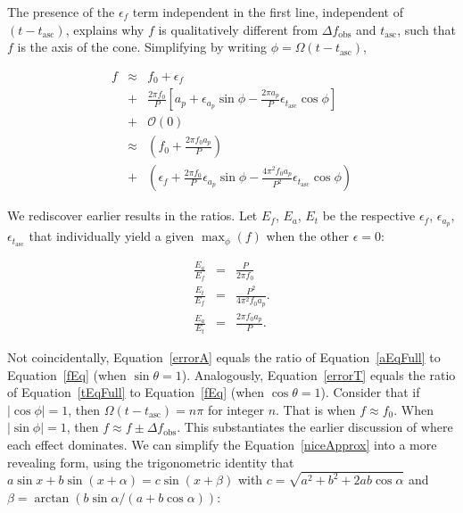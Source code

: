 \documentclass{article}
\begin{document}
The presence of the $\epsilon_f$ term independent in the first line, independent of $(t-t_\mathrm{asc})$, explains why $f$ is qualitatively different from $\Delta f_\mathrm{obs}$ and $t_\mathrm{asc}$, such that $f$ is the axis of the cone.
Simplifying by writing $\phi = \Omega (t- t_\mathrm{asc})$,

\begin{eqnarray}
f &\approx& f_0 + \epsilon_f \nonumber \\
                   &+&\frac{2 \pi f_0}{P}\left[
                     a_p
                   + \epsilon_{a_p} \sin \phi
                   - \frac{2 \pi  a_p}{P} \epsilon_{t_\mathrm{asc}} \cos \phi \right] \nonumber \\
                   &+& \mathcal{O}(0)\\
  &\approx& \left(f_0 + \frac{2\pi f_0 a_p}{P} \right) \nonumber \\
  &+& \left(\epsilon_f + \frac{2 \pi f_0}{P} \epsilon_{a_p} \sin\phi - \frac{4 \pi^2 f_0 a_p}{P^2} \epsilon_{t_\mathrm{asc}} \cos\phi\right)
\label{niceApprox}
\end{eqnarray}

We rediscover earlier results in the ratios.
Let $E_f$, $E_a$, $E_t$ be the respective $\epsilon_f$, $\epsilon_{a_p}$, $\epsilon_{t_\mathrm{asc}}$ that individually yield a given $\max_\phi (f)$ when the other $\epsilon =0$:

\begin{eqnarray}
\frac{E_a }{ E_f }  &=& \frac{P }{2 \pi f_0} \label{errorA}\\
\frac{E_t }{ E_f }  &=& \frac{P^2}{4 \pi^2 f_0 a_p}.\label{errorT}\\
\frac{E_a}{E_t} &=& \frac{2 \pi f_0 a_p}{P}.\label{errorAT}
\end{eqnarray}

\noindent Not coincidentally, Equation~\ref{errorA} equals the ratio of Equation~\ref{aEqFull} to Equation~\ref{fEq} (when $\sin \theta = 1$).
Analogously, Equation~\ref{errorT} equals the ratio of Equation~\ref{tEqFull} to Equation~\ref{fEq} (when $\cos \theta = 1$).
Consider that if $|\cos \phi| = 1$, then $\Omega (t-t_\mathrm{asc}) = n \pi$ for integer $n$.
That is when $f \approx f_0$.
When $|\sin \phi| = 1$, then $f \approx f \pm \Delta f_\mathrm{obs}$.
This substantiates the earlier discussion of where each effect dominates.
We can simplify the Equation~\ref{niceApprox} into a more revealing form, using the trigonometric identity that $a \sin x + b\sin (x+\alpha) = c\sin(x + \beta)$ with $c =\sqrt{a^2 + b^2 + 2 a b \cos \alpha}$ and $\beta  = \arctan(b \sin \alpha / (a + b \cos \alpha))$: 
\end{document}
